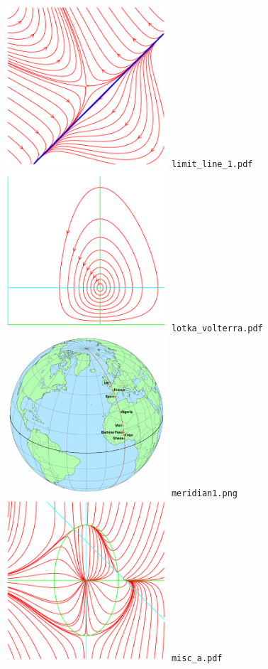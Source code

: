 \documentclass[a4paper]{amsart}
\begin{document}
\includegraphics[width=6cm]{limit_line_1.pdf}\verb+ limit_line_1.pdf+\\
\includegraphics[width=6cm]{lotka_volterra.pdf}\verb+ lotka_volterra.pdf+\\
\includegraphics[width=6cm]{meridian1.png}\verb+ meridian1.png+\\
\includegraphics[width=6cm]{misc_a.pdf}\verb+ misc_a.pdf+\\
\end{document}
